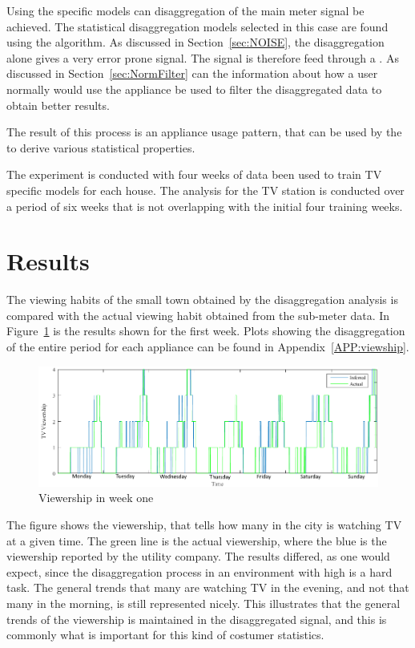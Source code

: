 Using the specific models can disaggregation of the main meter signal be achieved. The statistical disaggregation models selected in this case are found using the  algorithm. As discussed in Section~\ref{sec:NOISE}, the disaggregation alone gives a very error prone signal. The signal is therefore feed through a . As discussed in Section~\ref{sec:NormFilter} can the information about how a user normally would use the appliance be used to filter the disaggregated data to obtain better results. 

The result of this process is an appliance usage pattern, that can be used by the  to derive various statistical properties.  

The experiment is conducted with four weeks of data been used to train TV specific models for each house. The analysis for the TV station is conducted over a period of six weeks that is not overlapping with the initial four training weeks. 

\section{Results}
The viewing habits of the small town obtained by the disaggregation analysis is compared with the actual viewing habit obtained from the sub-meter data. In Figure~\ref{fig:WHW} is the results shown for the first week. Plots showing the disaggregation of the entire period for each appliance can be found in Appendix~\ref{APP:viewship}.

\begin{figure}[H]
\centering
\includegraphics[width=1\textwidth]{billeder/Viewership.png}
\caption{Viewership in week one}
\label{fig:WHW}
\end{figure}

The figure shows the viewership, that tells how many in the city is watching TV at a given time. The green line is the actual viewership, where the blue is the viewership reported by the utility company. The results differed, as one would expect, since the disaggregation process in an environment with high  is a hard task. The general trends that many are watching TV in the evening, and not that many in the morning, is still represented nicely. This illustrates that the general trends of the viewership is maintained in the disaggregated signal, and this is commonly what is important for this kind of costumer statistics. 

